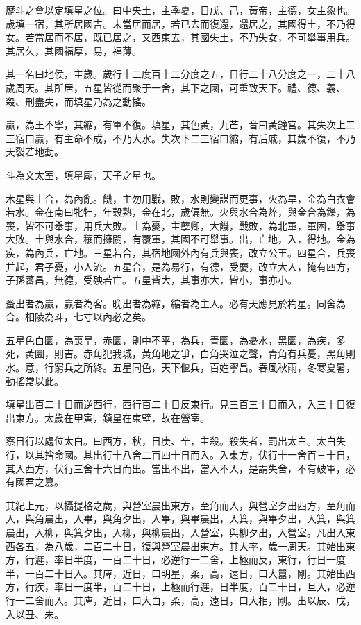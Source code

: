 歷斗之會以定填星之位。曰中央土，主季夏，日戊、己，黃帝，主德，女主象也。歲填一宿，其所居國吉。未當居而居，若已去而復還，還居之，其國得土，不乃得女。若當居而不居，既已居之，又西東去，其國失土，不乃失女，不可舉事用兵。其居久，其國福厚，易，福薄。

其一名曰地侯，主歲。歲行十二度百十二分度之五，日行二十八分度之一，二十八歲周天。其所居，五星皆從而聚于一舍，其下之國，可重致天下。禮、德、義、殺、刑盡失，而填星乃為之動搖。

贏，為王不寧，其縮，有軍不復。填星，其色黃，九芒，音曰黃鐘宮。其失次上二三宿曰贏，有主命不成，不乃大水。失次下二三宿曰縮，有后戚，其歲不復，不乃天裂若地動。

斗為文太室，填星廟，天子之星也。

木星與土合，為內亂。饑，主勿用戰，敗，水則變謀而更事，火為旱，金為白衣會若水。金在南曰牝牡，年穀熟，金在北，歲偏無。火與水合為焠，與金合為鑠，為喪，皆不可舉事，用兵大敗。土為憂，主孽卿，大饑，戰敗，為北軍，軍困，舉事大敗。土與水合，穰而擁閼，有覆軍，其國不可舉事。出，亡地，入，得地。金為疾，為內兵，亡地。三星若合，其宿地國外內有兵與喪，改立公王。四星合，兵喪并起，君子憂，小人流。五星合，是為易行，有德，受慶，改立大人，掩有四方，子孫蕃昌，無德，受殃若亡。五星皆大，其事亦大，皆小，事亦小。

蚤出者為贏，贏者為客。晚出者為縮，縮者為主人。必有天應見於杓星。同舍為合。相陵為斗，七寸以內必之矣。

五星色白圜，為喪旱，赤圜，則中不平，為兵，青圜，為憂水，黑圜，為疾，多死，黃圜，則吉。赤角犯我城，黃角地之爭，白角哭泣之聲，青角有兵憂，黑角則水。意，行窮兵之所終。五星同色，天下偃兵，百姓寧昌。春風秋雨，冬寒夏暑，動搖常以此。

填星出百二十日而逆西行，西行百二十日反東行。見三百三十日而入，入三十日復出東方。太歲在甲寅，鎮星在東壁，故在營室。

察日行以處位太白。曰西方，秋，日庚、辛，主殺。殺失者，罰出太白。太白失行，以其捨命國。其出行十八舍二百四十日而入。入東方，伏行十一舍百三十日，其入西方，伏行三舍十六日而出。當出不出，當入不入，是謂失舍，不有破軍，必有國君之篡。

其紀上元，以攝提格之歲，與營室晨出東方，至角而入，與營室夕出西方，至角而入，與角晨出，入畢，與角夕出，入畢，與畢晨出，入箕，與畢夕出，入箕，與箕晨出，入柳，與箕夕出，入柳，與柳晨出，入營室，與柳夕出，入營室。凡出入東西各五，為八歲，二百二十日，復與營室晨出東方。其大率，歲一周天。其始出東方，行遲，率日半度，一百二十日，必逆行一二舍，上極而反，東行，行日一度半，一百二十日入。其庳，近日，曰明星，柔，高，遠日，曰大囂，剛。其始出西方，行疾，率日一度半，百二十日，上極而行遲，日半度，百二十日，旦入，必逆行一二舍而入。其庳，近日，曰大白，柔，高，遠日，曰大相，剛。出以辰、戌，入以丑、未。

